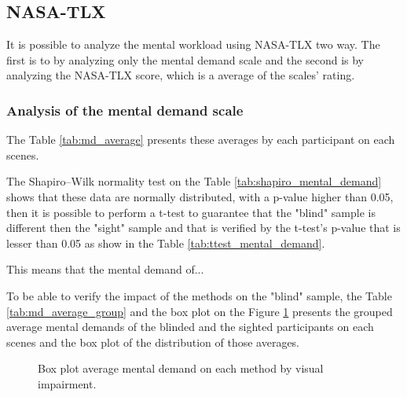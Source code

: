 \subsection{NASA-TLX}
\label{subsec:results_nasa_tlx}

It is possible to analyze the mental workload using NASA-TLX two way. The first is to by analyzing only the mental demand scale and the second is by analyzing the NASA-TLX score, which is a average of the scales' rating.

\subsubsection{Analysis of the mental demand scale}

The Table \ref{tab:md_average} presents these averages by each participant on each scenes.




The Shapiro–Wilk normality test on the Table \ref{tab:shapiro_mental_demand} shows that these data are normally distributed, with a p-value higher than 0.05, then it is possible to perform a t-test to guarantee that the "blind" sample is different then the "sight" sample and that is verified by the t-test's p-value that is lesser than 0.05 as show in the Table \ref{tab:ttest_mental_demand}.






This means that the mental demand of...


To be able to verify the impact of the methods on the "blind" sample, the Table \ref{tab:md_average_group} and the box plot on the Figure \ref{fig:boxplot_md_scene} presents the grouped average mental demands of the blinded and the sighted participants on each scenes and the box plot of the distribution of those averages.




\begin{figure}[!htb]
    \centering
    \resizebox{0.8\linewidth}{!}{
        
    }
    \caption{Box plot average mental demand on each method by visual impairment.}
    \label{fig:boxplot_md_scene}
\end{figure}



